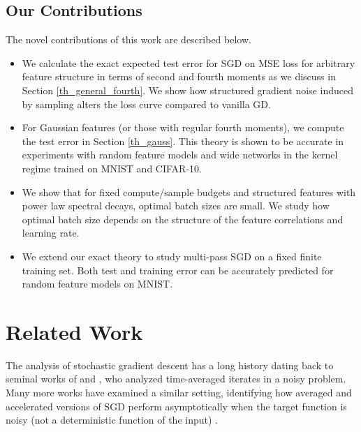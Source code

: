\documentclass{article} %
\newcommand{\cep}[1]{\textcolor{purple}{[Cengiz: #1]}}
\begin{document}
\subsection{Our Contributions}
The novel contributions of this work are described below.
\begin{itemize}
    \item We calculate the exact expected test error for SGD on MSE loss for arbitrary feature structure in terms of second and fourth moments as we discuss in Section \ref{th_general_fourth}. We show how structured gradient noise induced by sampling alters the loss curve compared to vanilla GD.
    \item For Gaussian features (or those with regular fourth moments), we compute the test error in Section \ref{th_gauss}. This theory is shown to be accurate in experiments with random feature models and wide networks in the kernel regime trained on MNIST and CIFAR-10. %
    \item We show that for fixed compute/sample budgets and structured features with power law spectral decays, optimal batch sizes are small. We study how optimal batch size depends on the structure of the feature correlations and learning rate.
    \item We extend our exact theory to study multi-pass SGD on a fixed finite training set. Both test and training error can be accurately predicted for random feature models on MNIST.
\end{itemize}


\section{Related Work}


The analysis of stochastic gradient descent has a long history dating back to seminal works of \citet{Polyak1992AccelerationOS} and \citet{Ruppert}, who analyzed time-averaged iterates in a noisy problem. Many more works have examined a similar setting, identifying how averaged and accelerated versions of SGD perform asymptotically when the target function is noisy (not a deterministic function of the input) \citep{flammarion2015averaging, flammarion_noisy_1_over_n, shapiro_stoch,robbins_monro, chung, duchi_ruan, yu2020analysis, anastasiu, gurbuzbalaban2020heavy}. 
\end{document}
